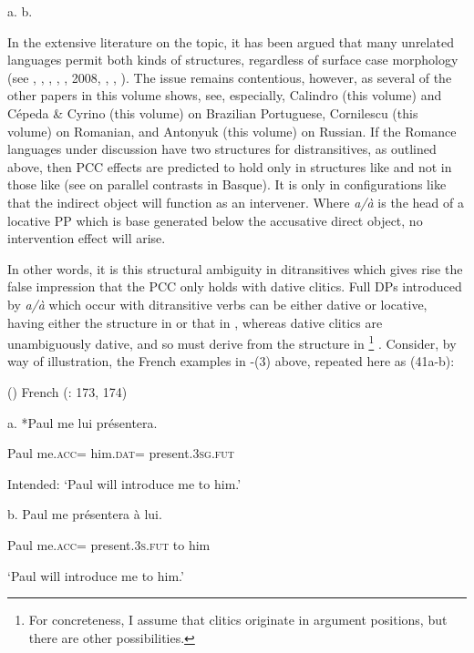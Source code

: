 \documentclass[output=paper,modfonts,nonflat]{langsci/langscibook}
\begin{document}
a.   b. 

In the extensive literature on the topic, it has been argued that many unrelated languages permit both kinds of structures, regardless of surface case morphology (see \citealt{Marantz1993}, \citealt{Pesetsky1995}, \citealt{Cuervo2003}, \citealt{Anagnostopoulou2003}, \citealt{Pylkkänen2002}, 2008, \citealt{MiyagawaTsujioka2004}, \citealt{Bruening2010}, \citealt{HarleyMiyagawa2017}). The issue remains contentious, however, as several of the other papers in this volume shows, see, especially, Calindro (this volume) and Cépeda \& Cyrino (this volume) on Brazilian Portuguese, Cornilescu (this volume) on Romanian, and Antonyuk (this volume) on Russian. If the Romance languages under discussion have two structures for distransitives, as outlined above, then PCC effects are predicted to hold only in structures like  and not in those like  (see \citealt{Rezac2008} on parallel contrasts in Basque). It is only in configurations like  that the indirect object will function as an intervener. Where \textit{a/à} is the head of a locative PP which is base generated below the accusative direct object, no intervention effect will arise. 

In other words, it is this structural ambiguity in ditransitives which gives rise the false impression that the PCC only holds with dative clitics. Full DPs introduced by \textit{a/à} which occur with ditransitive verbs can be either dative or locative, having either the structure in  or that in , whereas dative clitics are unambiguously dative, and so must derive from the structure in \footnote{For concreteness, I assume that clitics originate in argument positions, but there are other possibilities.} . Consider, by way of illustration, the French examples in -(3) above, repeated here as (41a-b): 

()  French (\citealt{Kayne1975}: 173, 174)

  a.    *Paul   me       lui       présentera.

      Paul   me.\textsc{acc}=   him.\textsc{dat=} present.\textsc{3sg.fut}

    Intended: ‘Paul will introduce me to him.’

b.   Paul   me     présentera     à lui.

    Paul  me.\textsc{acc}=  present.\textsc{3s.fut}   to him

    ‘Paul will introduce me to him.’
\end{document}
